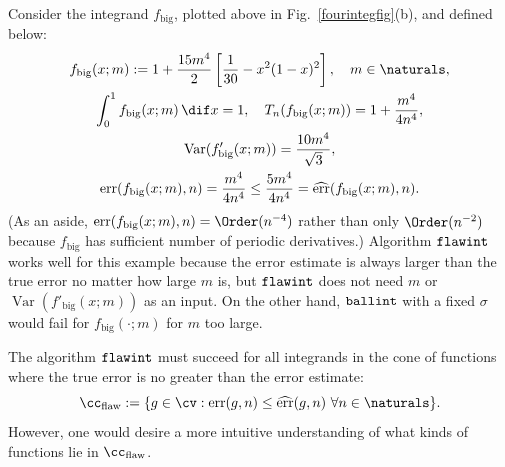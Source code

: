 \documentclass[]{article}
\DeclareMathOperator{\flawinteg}{\texttt{\textup{flawint}}}
\DeclareMathOperator{\ballinteg}{\texttt{\textup{ballint}}}
\DeclareMathOperator{\Var}{Var}
\DeclareMathOperator{\err}{err}
\newcommand{\herr}{\widehat{\err}}
\theoremstyle{definition}
\theoremstyle{remark}
\begin{document}
Consider the integrand $f_{\text{big}}$, plotted above in Fig.\ \ref{fourintegfig}(b), and defined below:
\begin{subequations} \label{fbig}
\begin{gather} 
f_{\text{big}}(x;m) :=  1 + \frac{15 m^4}{2} \left[ \frac{1}{30} - x^2(1-x)^2 \right], \quad m \in \naturals, \\
\int_0^1 f_{\text{big}}(x;m) \, \dif x =  1, \quad T_{n}(f_{\text{big}}(x;m))= 1 + \frac{m^4}{4n^4},  \\
\Var(f'_{\text{big}}(x;m)) = \frac{10 m^4}{\sqrt{3}},  \\ \err(f_{\text{big}}(x;m),n)=\frac{m^4}{4n^4} \le \frac{5m^4}{4n^4} = \herr(f_{\text{big}}(x;m),n).
\end{gather}
\end{subequations}
(As an aside, $\err(f_{\text{big}}(x;m),n) = \Order (n^{-4})$ rather than only $\Order (n^{-2})$ because $f_{\text{big}}$ has sufficient number of periodic  derivatives.)  Algorithm $\flawinteg$ works well for this example because the error estimate is always larger than the true error no matter how large $m$ is, but $\flawinteg$ does not need $m$ or $\Var(f'_{\text{big}}(x;m))$ as an input.  On the other hand, $\ballinteg$ with a fixed $\sigma$ would fail for $f_{\text{big}}(\cdot; m)$ for $m$ too large.

The algorithm $\flawinteg$ must succeed for all integrands in the cone of functions where the true error is no greater than the error estimate:
\begin{equation*} 
\cc_{\text{flaw}} : = \{g \in \cv : \err(g,n) \le \herr(g,n) \ \forall n \in \naturals\}.
\end{equation*}
However, one would desire a more intuitive understanding of what kinds of functions lie in $\cc_{\text{flaw}}$.
\end{document}
